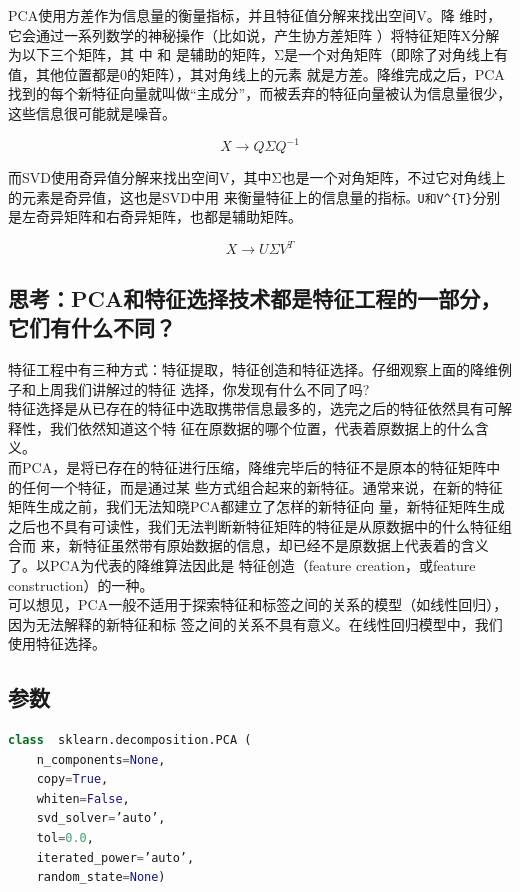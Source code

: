 \documentclass{article}
\begin{document}
	
	PCA使用方差作为信息量的衡量指标，并且特征值分解来找出空间V。降
	维时，它会通过一系列数学的神秘操作（比如说，产生协方差矩阵 ）将特征矩阵X分解为以下三个矩阵，其
	中 和 是辅助的矩阵，Σ是一个对角矩阵（即除了对角线上有值，其他位置都是0的矩阵），其对角线上的元素
	就是方差。降维完成之后，PCA找到的每个新特征向量就叫做“主成分”，而被丢弃的特征向量被认为信息量很少，
	这些信息很可能就是噪音。
	
	\begin{equation}
		X  \rightarrow Q \Sigma Q^{-1}
	\end{equation}
	
	而SVD使用奇异值分解来找出空间V，其中Σ也是一个对角矩阵，不过它对角线上的元素是奇异值，这也是SVD中用
	来衡量特征上的信息量的指标\verb|。U和V^{T}|分别是左奇异矩阵和右奇异矩阵，也都是辅助矩阵。
	
	$$ X  \rightarrow U \Sigma V^{T} $$
	
	\subsection{思考：PCA和特征选择技术都是特征工程的一部分，它们有什么不同？}
	特征工程中有三种方式：特征提取，特征创造和特征选择。仔细观察上面的降维例子和上周我们讲解过的特征
	选择，你发现有什么不同了吗?\\
	特征选择是从已存在的特征中选取携带信息最多的，选完之后的特征依然具有可解释性，我们依然知道这个特
	征在原数据的哪个位置，代表着原数据上的什么含义。\\
	而PCA，是将已存在的特征进行压缩，降维完毕后的特征不是原本的特征矩阵中的任何一个特征，而是通过某
	些方式组合起来的新特征。通常来说，在新的特征矩阵生成之前，我们无法知晓PCA都建立了怎样的新特征向
	量，新特征矩阵生成之后也不具有可读性，我们无法判断新特征矩阵的特征是从原数据中的什么特征组合而
	来，新特征虽然带有原始数据的信息，却已经不是原数据上代表着的含义了。{\heiti 以PCA为代表的降维算法因此是
	特征创造（feature creation，或feature construction）的一种。}\\
	可以想见，PCA一般不适用于探索特征和标签之间的关系的模型（如线性回归），因为无法解释的新特征和标
	签之间的关系不具有意义。在线性回归模型中，我们使用特征选择。\\
	
	\subsection{参数}
	\begin{lstlisting}[language=python]
	class  sklearn.decomposition.PCA (
	n_components=None, 
	copy=True, 
	whiten=False, 
	svd_solver=’auto’, 
	tol=0.0,
	iterated_power=’auto’, 
	random_state=None)
	\end{lstlisting}
	
\end{document}
